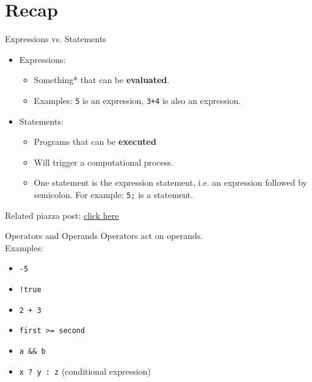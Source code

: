 \documentclass[10pt]{beamer}
\begin{document}
\section[Recap]{Recap}

{%
\begin{frame}[fragile]{Expressions vs. Statements}
  \begin{itemize}
    \item Expressions: \\
    \begin{itemize}
      \item Something* that can be \textbf{evaluated}.
      \item Examples: \verb|5| is an expression, \verb|3+4| is also an expression.
    \end{itemize}

    \item Statements: \\
    \begin{itemize}
      \item Programs that can be \textbf{executed}
      \item Will trigger a computational process.
      \item One statement is the expression statement, i.e. an expression followed by semicolon. For example: \verb|5;| is a statement.
    \end{itemize}

  \end{itemize}  
  Related piazza post: \href{https://piazza.com/class/kas136yscf8605?cid=79}{\underline{click here}}
\end{frame}
}

\begin{frame}[fragile]{Operators and Operands}
  Operators act on operands. \\
  Examples:
  \begin{itemize}
    \item \texttt{-5}
    \item \verb|!true|
    \item \verb|2 + 3|
    \item \verb|first >= second|
    \item \verb|a && b|
    \item \verb|x ? y : z| (conditional expression)
  \end{itemize}  
\end{frame}
\end{document}
